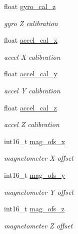 \begin{DoxyCompactItemize}
float \hyperlink{struct____mavlink__sensor__offsets__t_ab45f5929893095964c5e587692232fe0}{gyro\+\_\+cal\+\_\+z}
\begin{DoxyCompactList}\small\item\em gyro Z calibration \end{DoxyCompactList}\item 
float \hyperlink{struct____mavlink__sensor__offsets__t_ac1b95cee46b4b9e7aaa9d1ed74cdf813}{accel\+\_\+cal\+\_\+x}
\begin{DoxyCompactList}\small\item\em accel X calibration \end{DoxyCompactList}\item 
float \hyperlink{struct____mavlink__sensor__offsets__t_a703c195f8f93003240f712bd064a15f3}{accel\+\_\+cal\+\_\+y}
\begin{DoxyCompactList}\small\item\em accel Y calibration \end{DoxyCompactList}\item 
float \hyperlink{struct____mavlink__sensor__offsets__t_aa4a69d54d3b695827130b5169cc3cb3f}{accel\+\_\+cal\+\_\+z}
\begin{DoxyCompactList}\small\item\em accel Z calibration \end{DoxyCompactList}\item 
int16\+\_\+t \hyperlink{struct____mavlink__sensor__offsets__t_a007b00a1e31b4a6284dd67f7374c6252}{mag\+\_\+ofs\+\_\+x}
\begin{DoxyCompactList}\small\item\em magnetometer X offset \end{DoxyCompactList}\item 
int16\+\_\+t \hyperlink{struct____mavlink__sensor__offsets__t_a4a26f18c78ab00970f0e17f1abb3f254}{mag\+\_\+ofs\+\_\+y}
\begin{DoxyCompactList}\small\item\em magnetometer Y offset \end{DoxyCompactList}\item 
int16\+\_\+t \hyperlink{struct____mavlink__sensor__offsets__t_aa9fff1075990d27c19d475ece1ebc147}{mag\+\_\+ofs\+\_\+z}
\begin{DoxyCompactList}\small\item\em magnetometer Z offset \end{DoxyCompactList}\end{DoxyCompactItemize}


